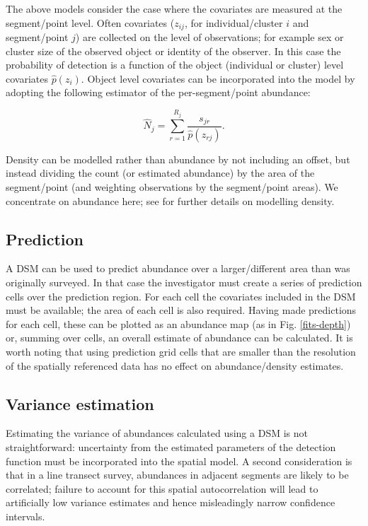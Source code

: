 \documentclass[a4paper,12pt]{article}
\begin{document}
The above models consider the case where the covariates are measured at the segment/point level. Often covariates ($z_{ij}$, for individual/cluster $i$ and segment/point $j$) are collected on the level of observations; for example sex or cluster size of the observed object or identity of the observer. In this case the probability of detection is a function of the object (individual or cluster) level covariates $\hat{p}(z_i)$. Object level covariates can be incorporated into the model by adopting the following estimator of the per-segment/point abundance:

\begin{equation*}
\hat{N}_j = \sum_{r=1}^{R_j} \frac{s_{jr}}{\hat{p}(z_{rj})}.
\end{equation*}

Density can be modelled rather than abundance by not including an offset, but instead dividing the count (or estimated abundance) by the area of the segment/point (and weighting observations by the segment/point areas). We concentrate on abundance here; see \cite{Hedley:2004et} for further details on modelling density.

\subsection*{Prediction}

A DSM can be used to predict abundance over a larger/different area than was originally surveyed. In that case the investigator must create a series of prediction cells over the prediction region. For each cell the covariates included in the DSM must be available; the area of each cell is also required. Having made predictions for each cell, these can be plotted as an abundance map (as in Fig. \ref{fits-depth}) or, summing over cells, an overall estimate of abundance can be calculated. It is worth noting that using prediction grid cells that are smaller than the resolution of the spatially referenced data has no effect on abundance/density estimates.

\subsection*{Variance estimation}

Estimating the variance of abundances calculated using a DSM is not straightforward: uncertainty from the estimated parameters of the detection function must be incorporated into the spatial model. A second consideration is that in a line transect survey, abundances in adjacent segments are likely to be correlated; failure to account for this spatial autocorrelation will lead to artificially low variance estimates and hence misleadingly narrow confidence intervals.
\end{document}
